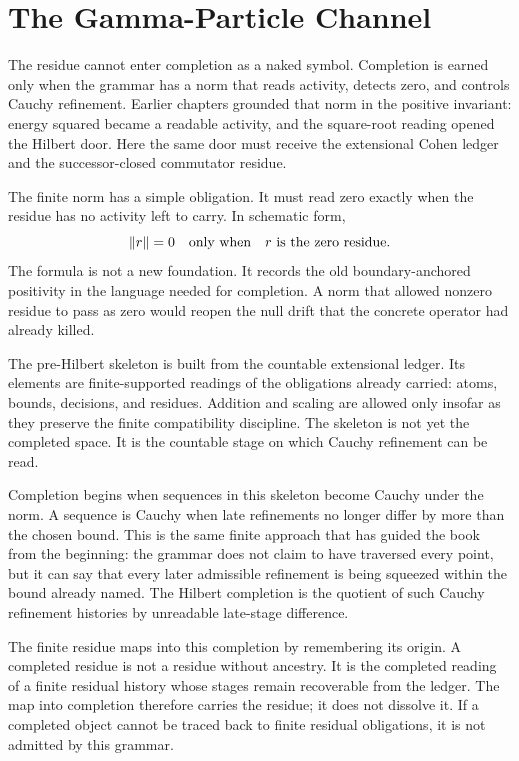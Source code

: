 \section{The Gamma-Particle Channel}

The residue cannot enter completion as a naked symbol. Completion is earned
only when the grammar has a norm that reads activity, detects zero, and
controls Cauchy refinement. Earlier chapters grounded that norm in the
positive invariant: energy squared became a readable activity, and the
square-root reading opened the Hilbert door. Here the same door must receive
the extensional Cohen ledger and the successor-closed commutator residue.

The finite norm has a simple obligation. It must read zero exactly when the
residue has no activity left to carry. In schematic form,
\[
  \|r\| = 0 \quad\hbox{only when}\quad r \hbox{ is the zero residue.}
\]
The formula is not a new foundation. It records the old boundary-anchored
positivity in the language needed for completion. A norm that allowed
nonzero residue to pass as zero would reopen the null drift that the
concrete operator had already killed.

The pre-Hilbert skeleton is built from the countable extensional ledger.
Its elements are finite-supported readings of the obligations already
carried: atoms, bounds, decisions, and residues. Addition and scaling are
allowed only insofar as they preserve the finite compatibility discipline.
The skeleton is not yet the completed space. It is the countable stage on
which Cauchy refinement can be read.

Completion begins when sequences in this skeleton become Cauchy under the
norm. A sequence is Cauchy when late refinements no longer differ by more
than the chosen bound. This is the same finite approach that has guided the
book from the beginning: the grammar does not claim to have traversed every
point, but it can say that every later admissible refinement is being squeezed
within the bound already named. The Hilbert completion is the quotient of
such Cauchy refinement histories by unreadable late-stage difference.

The finite residue maps into this completion by remembering its origin. A
completed residue is not a residue without ancestry. It is the completed
reading of a finite residual history whose stages remain recoverable from
the ledger. The map into completion therefore carries the residue; it does
not dissolve it. If a completed object cannot be traced back to finite
residual obligations, it is not admitted by this grammar.

